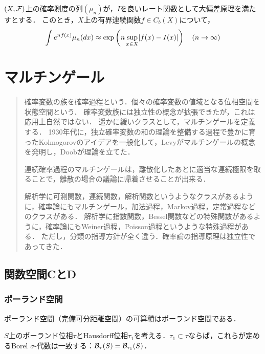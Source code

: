 \documentclass[uplatex,dvipdfmx]{jsreport}
\begin{document}
\begin{lemma}
    $(X,\mathcal{F})$上の確率測度の列$(\mu_n)$が，$I$を良いレート関数として大偏差原理を満たすとする．
    このとき，$X$上の有界連続関数$f\in C_b(X)$について，
    \[\int e^{nf(x)}\mu_n(dx)\approx\exp\left(n\sup_{x\in X}\lvert f(x)-I(x)\rvert\right)\quad(n\to\infty)\]
\end{lemma}

\chapter{マルチンゲール}

\begin{quotation}
    確率変数の族を確率過程という．個々の確率変数の値域となる位相空間を状態空間という．
    確率変数族には独立性の概念が拡張できたが，これは応用上自然ではない．
    遥かに緩いクラスとして，マルチンゲールを定義する．
    1930年代に，独立確率変数の和の理論を整備する過程で豊かに育ったKolmogorovのアイデアを一般化して，Levyがマルチンゲールの概念を発明し，Doobが理論を立てた．

    連続確率過程のマルチンゲールは，離散化したあとに適当な連続極限を取ることで，離散の場合の議論に帰着させることが出来る．

    解析学に可測関数，連続関数，解析関数というようなクラスがあるように，確率論にもマルチンゲール，加法過程，Markov過程，定常過程などのクラスがある．
    解析学に指数関数，Bessel関数などの特殊関数があるように，確率論にもWeiner過程，Poisson過程というような特殊過程がある．
    ただし，分類の指導方針が全く違う．確率論の指導原理は独立性であってきた．
\end{quotation}

\section{関数空間CとD}

\subsection{ポーランド空間}

\begin{lemma}
    ポーランド空間（完備可分距離空間）の可算積はポーランド空間である．
\end{lemma}

\begin{theorem}
    $S$上のポーランド位相$\tau$とHausdorff位相$\tau_1$を考える．$\tau_1\subset\tau$ならば，これらが定めるBorel $\sigma$-代数は一致する：$\mathcal{B}_\tau(S)=\mathcal{B}_{\tau_1}(S)$．
\end{theorem}
\end{document}
